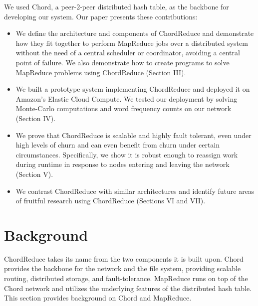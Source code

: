 We used Chord\cite{chord}, a peer-2-peer distributed hash table, as the backbone for developing our system.  Our paper presents these contributions:
\begin{itemize}
	\item We define the architecture and components of ChordReduce and demonstrate how they fit together to perform MapReduce jobs over a distributed system without the need of a central scheduler or coordinator, avoiding a central point of failure. We also demonstrate how to create programs to solve MapReduce problems using ChordReduce (Section III). 
	\item We built a prototype system implementing ChordReduce and deployed it on Amazon's Elastic Cloud Compute.  We tested our deployment by solving Monte-Carlo computations and word frequency counts on our network (Section IV).
	\item We prove that ChordReduce is scalable and highly fault tolerant, even under high levels of churn and can even benefit from churn under certain circumstances. Specifically, we show it is robust enough to reassign work during runtime in response to nodes entering and leaving the network (Section V).
	\item We contrast ChordReduce with similar architectures and identify future areas of fruitful research using ChordReduce (Sections  VI and VII). 





\end{itemize}

\section{Background}
ChordReduce takes its name from the two components it is built upon.  Chord\cite{chord} provides the backbone for the network and the file system, providing scalable routing, distributed storage, and fault-tolerance.   MapReduce runs on top of the Chord network and utilizes the underlying features of the distributed hash table.  This section provides background on Chord and MapReduce.

